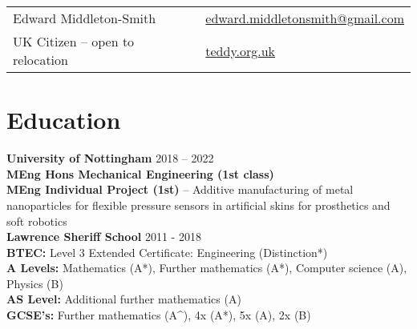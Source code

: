 \documentclass[10pt,a4paper]{article}
\begin{document}
\begin{center}
\begin{tabular}{p{}p{}}
{\huge Edward Middleton-Smith} 
& \href{mailto:edward.middletonsmith@gmail.com}{edward.middletonsmith@gmail.com} \\
\vspace{1pt}
UK Citizen – open to relocation 
& \vspace{1pt}
\href{https://www.teddy.org.uk}{teddy.org.uk} \\
\end{tabular}
\end{center}

\section*{Education}\vspace{-\baselineskip}\medskip
\textbf{University of Nottingham} \hfill 2018 -- 2022\smallskip\\
\textbf{MEng Hons Mechanical Engineering (1st class)}\smallskip\\
\textbf{MEng Individual Project (1st)} -- Additive manufacturing of metal nanoparticles for flexible pressure sensors in artificial skins for prosthetics and soft robotics\vspace{3pt}\\
\textbf{Lawrence Sheriff School} \hfill 2011 - 2018\smallskip\\
\textbf{BTEC:} Level 3 Extended Certificate: Engineering (Distinction*)\\
\textbf{A Levels:} Mathematics (A*), Further mathematics (A*), Computer science (A), Physics (B)\\
\textbf{AS Level:} Additional further mathematics (A)\\
\textbf{GCSE's:} Further mathematics (A\^{}), 4x (A*), 5x (A), 2x (B)
\end{document}
